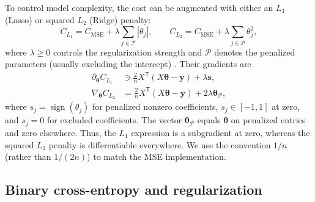\documentclass[aps,rmp,reprint,amsmath,amssymb,graphicx,longbibliography]{revtex4-1}
\begin{document}
To control model complexity, the cost can be augmented with either an
$L_1$ (Lasso) or squared $L_2$ (Ridge) penalty:
\begin{equation}
    C_{L_1}=C_{\mathrm{MSE}}+\lambda\sum_{j\in\mathcal{P}}|\theta_j|,
    \qquad
    C_{L_2}=C_{\mathrm{MSE}}+\lambda\sum_{j\in\mathcal{P}}\theta_j^2,
\end{equation}
where $\lambda\geq0$ controls the regularization strength and
$\mathcal{P}$ denotes the penalized parameters (usually excluding the
intercept) \cite{Book_Ch3}. Their gradients are
\begin{align}
    \partial_{\boldsymbol{\theta}}C_{L_1}
    &\ni \frac{2}{n}X^{\mathsf T}(X\boldsymbol{\theta}-\mathbf{y})
      +\lambda\mathbf{s},\\
    \nabla_{\boldsymbol{\theta}}C_{L_2}
    &=\frac{2}{n}X^{\mathsf T}(X\boldsymbol{\theta}-\mathbf{y})
      +2\lambda\boldsymbol{\theta}_{\mathcal{P}},
\end{align}
where $s_j=\operatorname{sign}(\theta_j)$ for penalized nonzero
coefficients, $s_j\in[-1,1]$ at zero, and $s_j=0$ for excluded
coefficients. The vector $\boldsymbol{\theta}_{\mathcal{P}}$ equals
$\boldsymbol{\theta}$ on penalized entries and zero elsewhere.
Thus, the $L_1$ expression is a subgradient at zero, whereas the squared
$L_2$ penalty is differentiable everywhere. We use the convention
$1/n$ (rather than $1/(2n)$) to match the MSE implementation.


\subsection{Binary cross-entropy and regularization}
\label{subsec:binary_cross_entropy}
\end{document}

